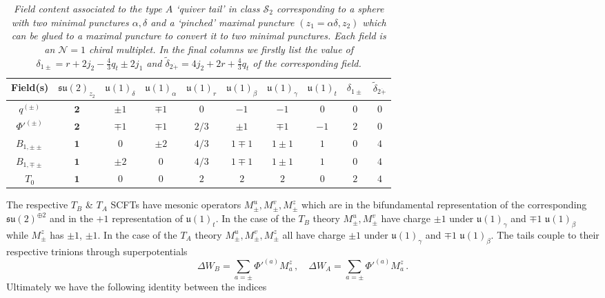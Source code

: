 \documentclass[main.tex]{subfiles}
\begin{document}
\begin{table}[ht!]
\centering
\begin{tabular}{|c |c|c|c|c|c|c|c|c| c|} 
 \hline
 Field(s) &$\mathfrak{su}(2)_{z_2}$&$\mathfrak{u}(1)_{\delta}$&$\mathfrak{u}(1)_{\alpha}$&$\mathfrak{u}(1)_{r}$&$\mathfrak{u}(1)_{\beta}$&$\mathfrak{u}(1)_{\gamma}$&$\mathfrak{u}(1)_{t}$&$\delta_{1\pm}$&$\widetilde{\delta}_{2\dot+}$\\[2pt] 
  \hline\hline
$q^{(\pm)}$&$\mathbf{2}$&$\pm1$&$\mp1$&$0$&$-1$&$-1$&$0$&$0$&$0$\\
$\Phi'^{(\pm)}$&$\mathbf{2}$&$\mp1$&$\mp1$&$2/3$&$\pm1$&$\mp1$&$-1$&$2$&$0$\\
$B_{1,\pm\pm}$&$\mathbf{1}$&$0$&$\pm2$&$4/3$&$1\mp1$&$1\pm1$&$1$&$0$&$4$ \\
$B_{1,\mp\pm}$&$\mathbf{1}$&$\pm2$&$0$&$4/3$&$1\mp1$&$1\pm1$&$1$&$0$ &$4$\\
$T_0$&$\mathbf{1}$&$0$&$0$&$2$&$2$&$2$&$0$&$2$&$4$\\\hline
\end{tabular}
\caption{\textit{Field content associated to the type $A$ `quiver tail' in class $\mathcal{S}_2$ corresponding to a sphere with two minimal punctures $\alpha,\delta$ and a `pinched' maximal puncture $(z_1=\alpha\delta,z_2)$ which can be glued to a maximal puncture to convert it to two minimal punctures. Each field is an $\mathcal{N}=1$ chiral multiplet. In the final columns we firstly list the value of $\delta_{1\pm}=r+2j_2-\frac{4}{3}q_t\pm 2j_1$ and $\widetilde{\delta}_{2\dot+}=4j_2+2r+\frac{4}{3}q_t$ of the corresponding field.}}
\label{tab:tailA}
\end{table}
The respective $T_B$ \& $T_A$ SCFTs have mesonic operators $M^{u}_{\pm}, M^{v}_{\pm},M^{z}_{\pm}$ which are in the bifundamental representation of the corresponding $\mathfrak{su}(2)^{\oplus2}$ and in the $+1$ representation of $\mathfrak{u}(1)_t$. In the case of the $T_B$ theory $M^{u}_{\pm}, M^{v}_{\pm}$ have charge $\pm1$ under $\mathfrak{u}(1)_{\gamma}$ and $\mp1$ $\mathfrak{u}(1)_{\beta}$ while $M^{z}_{\pm}$ has $\pm1$, $\pm1$. In the case of the $T_A$ theory $M^{u}_{\pm}, M^{v}_{\pm},M^{z}_{\pm}$ all have charge $\pm1$ under $\mathfrak{u}(1)_{\gamma}$ and $\mp1$ $\mathfrak{u}(1)_{\beta}$.  The tails couple to their respective trinions through superpotentials
\begin{equation}\label{eqn:tailsuperpot2}
\Delta W_B=\sum_{a=\pm}\Phi'^{(a)}M^z_{a}\,,\quad \Delta W_A=\sum_{a=\pm}\Phi'^{(a)}M^z_{a}\,.
\end{equation}
Ultimately we have the following identity between the indices 
\end{document}
